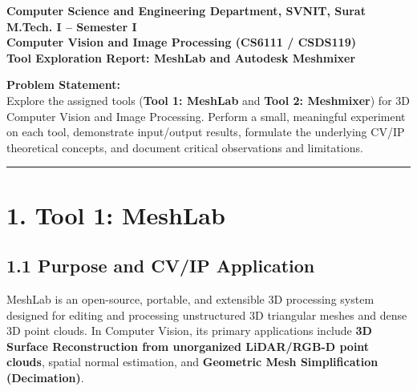\documentclass[12pt]{article}
\begin{document}

\begin{center}
\textbf{Computer Science and Engineering Department, SVNIT, Surat}\\
\textbf{M.Tech. I -- Semester I}\\
\textbf{Computer Vision and Image Processing (CS6111 / CSDS119)}\\
\textbf{Tool Exploration Report: MeshLab and Autodesk Meshmixer}
\end{center}

\vspace{0.2cm}

\textbf{Problem Statement:} \\
Explore the assigned tools (\textbf{Tool 1: MeshLab} and \textbf{Tool 2: Meshmixer}) for 3D Computer Vision and Image Processing. Perform a small, meaningful experiment on each tool, demonstrate input/output results, formulate the underlying CV/IP theoretical concepts, and document critical observations and limitations.

\vspace{0.3cm}
\hrule
\vspace{0.3cm}

\section*{1. Tool 1: MeshLab}

\subsection*{1.1 Purpose and CV/IP Application}
MeshLab is an open-source, portable, and extensible 3D processing system designed for editing and processing unstructured 3D triangular meshes and dense 3D point clouds. In Computer Vision, its primary applications include \textbf{3D Surface Reconstruction from unorganized LiDAR/RGB-D point clouds}, spatial normal estimation, and \textbf{Geometric Mesh Simplification (Decimation)}.
\end{document}
